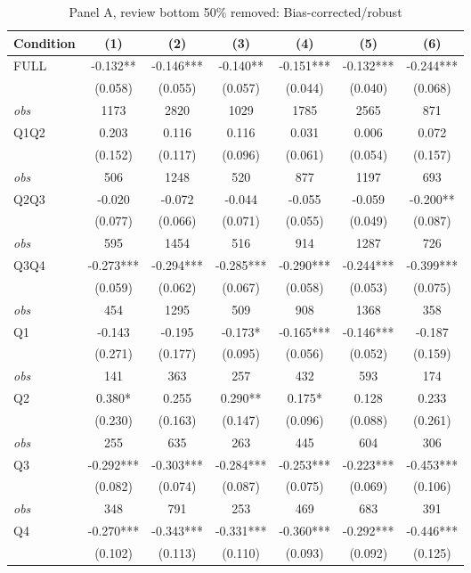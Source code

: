 \begin{table}[!htbp]
\centering
\caption{Panel A, review bottom 50\% removed: Bias-corrected/robust}
\begin{tabular}{lcccccc}
\toprule
Condition & (1) & (2) & (3) & (4) & (5) & (6) \\
\midrule
FULL & -0.132** & -0.146*** & -0.140** & -0.151*** & -0.132*** & -0.244*** \\
 & (0.058) & (0.055) & (0.057) & (0.044) & (0.040) & (0.068) \\
\textit{obs} & 1173 & 2820 & 1029 & 1785 & 2565 & 871 \\
Q1Q2 & 0.203 & 0.116 & 0.116 & 0.031 & 0.006 & 0.072 \\
 & (0.152) & (0.117) & (0.096) & (0.061) & (0.054) & (0.157) \\
\textit{obs} & 506 & 1248 & 520 & 877 & 1197 & 693 \\
Q2Q3 & -0.020 & -0.072 & -0.044 & -0.055 & -0.059 & -0.200** \\
 & (0.077) & (0.066) & (0.071) & (0.055) & (0.049) & (0.087) \\
\textit{obs} & 595 & 1454 & 516 & 914 & 1287 & 726 \\
Q3Q4 & -0.273*** & -0.294*** & -0.285*** & -0.290*** & -0.244*** & -0.399*** \\
 & (0.059) & (0.062) & (0.067) & (0.058) & (0.053) & (0.075) \\
\textit{obs} & 454 & 1295 & 509 & 908 & 1368 & 358 \\
Q1 & -0.143 & -0.195 & -0.173* & -0.165*** & -0.146*** & -0.187 \\
 & (0.271) & (0.177) & (0.095) & (0.056) & (0.052) & (0.159) \\
\textit{obs} & 141 & 363 & 257 & 432 & 593 & 174 \\
Q2 & 0.380* & 0.255 & 0.290** & 0.175* & 0.128 & 0.233 \\
 & (0.230) & (0.163) & (0.147) & (0.096) & (0.088) & (0.261) \\
\textit{obs} & 255 & 635 & 263 & 445 & 604 & 306 \\
Q3 & -0.292*** & -0.303*** & -0.284*** & -0.253*** & -0.223*** & -0.453*** \\
 & (0.082) & (0.074) & (0.087) & (0.075) & (0.069) & (0.106) \\
\textit{obs} & 348 & 791 & 253 & 469 & 683 & 391 \\
Q4 & -0.270*** & -0.343*** & -0.331*** & -0.360*** & -0.292*** & -0.446*** \\
 & (0.102) & (0.113) & (0.110) & (0.093) & (0.092) & (0.125) \\

\end{tabular}
\end{table}
